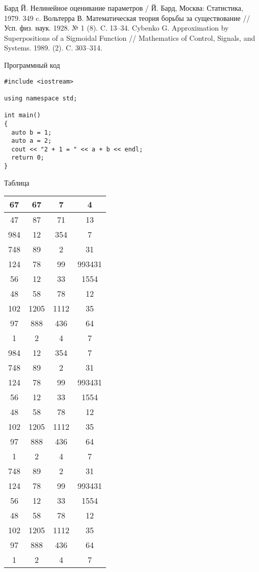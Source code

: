 \documentclass[rusmathsym, eqnumwithinsec, amspack, hyperref]{bomgost}
\begin{document}
\begin{thebibliography}{11}
 Бард Й. Нелинейное оценивание параметров / Й. Бард, Москва: Статистика, 1979. 349 c.
 Вольтерра В. Математическая теория борьбы за существование // Усп. физ. наук. 1928. № 1 (8). C. 13–34.
 Cybenko G. Approximation by Superpositions of a Sigmoidal Function // Mathematics of Control, Signals, and Systems. 1989. (2). C. 303–314.
\end{thebibliography}

\appendix

\begin{gostappendix}{Программный код}
\lstset{language=[11]c++,basicstyle=\ttfamily, showstringspaces=false}

\begin{lstlisting}
#include <iostream>

using namespace std;

int main()
{
  auto b = 1;
  auto a = 2;
  cout << "2 + 1 = " << a + b << endl;
  return 0;
}
\end{lstlisting}
\end{gostappendix}


\begin{gostappendix}{Таблица}
\begin{table}[H]
\centering
\begin{tabular}{|c|c|c|c|}
\hline 
67 & 67 & 7 & 4 \\ 
\hline 
47 & 87 & 71 & 13 \\ 
\hline 
984 & 12 & 354 & 7 \\ 
\hline 
748 & 89 & 2 & 31 \\ 
\hline 
124 & 78 & 99 & 993431 \\ 
\hline 
56 & 12 & 33 & 1554 \\ 
\hline 
48 & 58 & 78 & 12 \\ 
\hline 
102 & 1205 & 1112 & 35 \\ 
\hline 
97 & 888 & 436 & 64 \\ 
\hline 
1 & 2 & 4 & 7 \\
\hline
984 & 12 & 354 & 7 \\ 
\hline 
748 & 89 & 2 & 31 \\ 
\hline 
124 & 78 & 99 & 993431 \\ 
\hline 
56 & 12 & 33 & 1554 \\ 
\hline 
48 & 58 & 78 & 12 \\ 
\hline 
102 & 1205 & 1112 & 35 \\ 
\hline 
97 & 888 & 436 & 64 \\ 
\hline 
1 & 2 & 4 & 7 \\
\hline
748 & 89 & 2 & 31 \\ 
\hline 
124 & 78 & 99 & 993431 \\ 
\hline 
56 & 12 & 33 & 1554 \\ 
\hline 
48 & 58 & 78 & 12 \\ 
\hline 
102 & 1205 & 1112 & 35 \\ 
\hline 
97 & 888 & 436 & 64 \\ 
\hline 
1 & 2 & 4 & 7 \\ 
\hline 
\end{tabular} 
\end{table}
\end{gostappendix}
\end{document}

